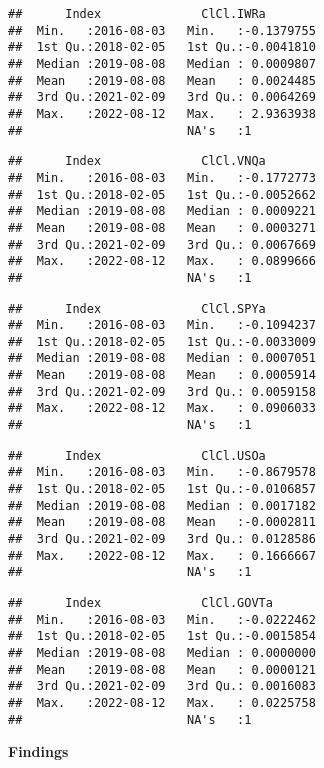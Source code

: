 \documentclass[
  12pt,
]{article}
\begin{document}
\begin{verbatim}
##      Index              ClCl.IWRa         
##  Min.   :2016-08-03   Min.   :-0.1379755  
##  1st Qu.:2018-02-05   1st Qu.:-0.0041810  
##  Median :2019-08-08   Median : 0.0009807  
##  Mean   :2019-08-08   Mean   : 0.0024485  
##  3rd Qu.:2021-02-09   3rd Qu.: 0.0064269  
##  Max.   :2022-08-12   Max.   : 2.9363938  
##                       NA's   :1
\end{verbatim}

\begin{verbatim}
##      Index              ClCl.VNQa         
##  Min.   :2016-08-03   Min.   :-0.1772773  
##  1st Qu.:2018-02-05   1st Qu.:-0.0052662  
##  Median :2019-08-08   Median : 0.0009221  
##  Mean   :2019-08-08   Mean   : 0.0003271  
##  3rd Qu.:2021-02-09   3rd Qu.: 0.0067669  
##  Max.   :2022-08-12   Max.   : 0.0899666  
##                       NA's   :1
\end{verbatim}

\begin{verbatim}
##      Index              ClCl.SPYa         
##  Min.   :2016-08-03   Min.   :-0.1094237  
##  1st Qu.:2018-02-05   1st Qu.:-0.0033009  
##  Median :2019-08-08   Median : 0.0007051  
##  Mean   :2019-08-08   Mean   : 0.0005914  
##  3rd Qu.:2021-02-09   3rd Qu.: 0.0059158  
##  Max.   :2022-08-12   Max.   : 0.0906033  
##                       NA's   :1
\end{verbatim}

\begin{verbatim}
##      Index              ClCl.USOa         
##  Min.   :2016-08-03   Min.   :-0.8679578  
##  1st Qu.:2018-02-05   1st Qu.:-0.0106857  
##  Median :2019-08-08   Median : 0.0017182  
##  Mean   :2019-08-08   Mean   :-0.0002811  
##  3rd Qu.:2021-02-09   3rd Qu.: 0.0128586  
##  Max.   :2022-08-12   Max.   : 0.1666667  
##                       NA's   :1
\end{verbatim}

\begin{verbatim}
##      Index              ClCl.GOVTa        
##  Min.   :2016-08-03   Min.   :-0.0222462  
##  1st Qu.:2018-02-05   1st Qu.:-0.0015854  
##  Median :2019-08-08   Median : 0.0000000  
##  Mean   :2019-08-08   Mean   : 0.0000121  
##  3rd Qu.:2021-02-09   3rd Qu.: 0.0016083  
##  Max.   :2022-08-12   Max.   : 0.0225758  
##                       NA's   :1
\end{verbatim}

\textbf{Findings}
\end{document}
